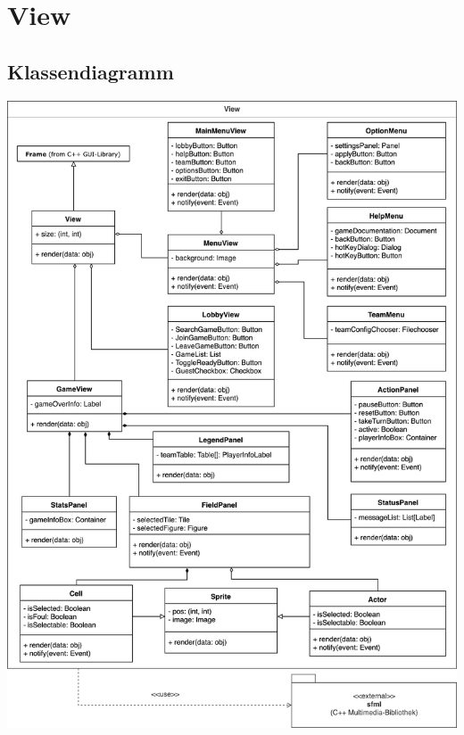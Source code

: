 \section{View}
\subsection{Klassendiagramm}
\begin{center}
	\includegraphics[width=14cm]{images/klassendiagramm_view_extended}
\end{center}

